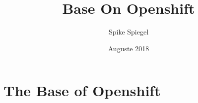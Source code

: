 \documentclass[12pt, letterpaper]{article}
\title{Base On Openshift}
\author{Spike Spiegel}
\date{Auguste 2018}
\begin{document}
\maketitle
\tableofcontents

\section{The Base of Openshift}



\listoffigures
\end{document}
